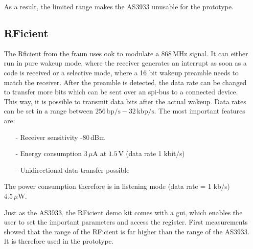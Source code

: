 As a result, the limited range makes the AS3933 unusable for the prototype. 

\subsection{RFicient}
The Rficient from the \acs{fraun} uses \acs{ook} to modulate a 868\,MHz signal.
It can either run in pure wakeup mode, where the receiver generates an interrupt as soon as a code is received or a selective mode, where a 16 bit wakeup preamble needs to match the receiver. 
After the preamble is detected, the data rate can be changed to transfer more bits which can be sent over an \acs{spi}-bus to a connected device.
This way, it is possible to transmit data bits after the actual wakeup.
Data rates can be set in a range between $256\,\text{bp/s}-32\,\text{kbp/s}$.
The most important features are:
\begin{itemize}
	\item[-] Receiver sensitivity -80\,dBm
	\item[-] Energy consumption $3\,\mu\text{A}$ at $1.5\,\text{V}$ (data rate 1 kbit/s)
	\item[-] Unidirectional data transfer possible	
\end{itemize}
The power consumption therefore is in listening mode (data rate = 1 kb/s) $4.5\,\mu\text{W}$.

Just as the AS3933, the RFicient demo kit comes with a \acs{gui}, which enables the user to set the important parameters and access the register\cite{rficient}.
First measurements showed that the range of the RFicient is far higher than the range of the AS3933.
It is therefore used in the prototype.